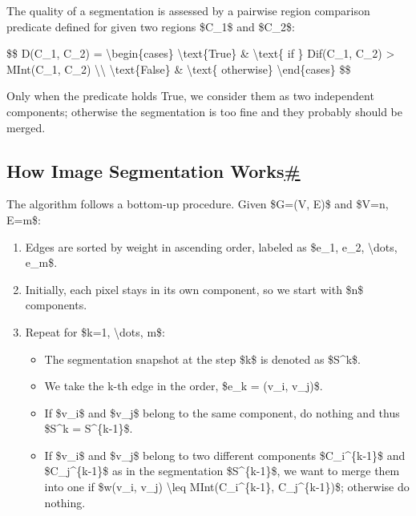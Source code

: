 The quality of a segmentation is assessed by a pairwise region comparison predicate defined for given two regions \$C\_1\$ and \$C\_2\$:

\$\$ D(C\_1, C\_2) = \textbackslash begin\{cases\} \textbackslash text\{True\} \& \textbackslash text\{ if \} Dif(C\_1, C\_2) \textgreater{} MInt(C\_1, C\_2) \textbackslash\textbackslash{} \textbackslash text\{False\} \& \textbackslash text\{ otherwise\} \textbackslash end\{cases\} \$\$

Only when the predicate holds True, we consider them as two independent components; otherwise the segmentation is too fine and they probably should be merged.

\subsection{\texorpdfstring{How Image Segmentation Works\hyperref[how-image-segmentation-works]{\#}}{How Image Segmentation Works\#}}\label{how-image-segmentation-works}

The algorithm follows a bottom-up procedure. Given \$G=(V, E)\$ and \$\textbar V\textbar=n, \textbar E\textbar=m\$:

\begin{enumerate}
\tightlist
\item
  Edges are sorted by weight in ascending order, labeled as \$e\_1, e\_2, \textbackslash dots, e\_m\$.
\item
  Initially, each pixel stays in its own component, so we start with \$n\$ components.
\item
  Repeat for \$k=1, \textbackslash dots, m\$:

  \begin{itemize}
  \tightlist
  \item
    The segmentation snapshot at the step \$k\$ is denoted as \$S\^{}k\$.
  \item
    We take the k-th edge in the order, \$e\_k = (v\_i, v\_j)\$.
  \item
    If \$v\_i\$ and \$v\_j\$ belong to the same component, do nothing and thus \$S\^{}k = S\^{}\{k-1\}\$.
  \item
    If \$v\_i\$ and \$v\_j\$ belong to two different components \$C\_i\^{}\{k-1\}\$ and \$C\_j\^{}\{k-1\}\$ as in the segmentation \$S\^{}\{k-1\}\$, we want to merge them into one if \$w(v\_i, v\_j) \textbackslash leq MInt(C\_i\^{}\{k-1\}, C\_j\^{}\{k-1\})\$; otherwise do nothing.
  \end{itemize}
\end{enumerate}

